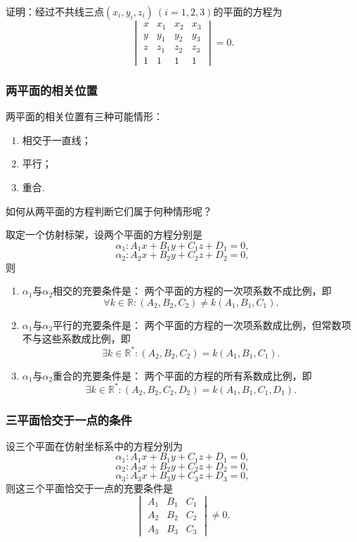 \begin{example}
证明：经过不共线三点\((x_i,y_i,z_i)\ (i=1,2,3)\)的平面的方程为\[
	\begin{vmatrix}
		x & x_1 & x_2 & x_3 \\
		y & y_1 & y_2 & y_3 \\
		z & z_1 & z_2 & z_3 \\
		1 & 1 & 1 & 1
	\end{vmatrix} = 0.
\]
\end{example}

\subsubsection{两平面的相关位置}
两平面的相关位置有三种可能情形：
\begin{enumerate}
	\item 相交于一直线；
	\item 平行；
	\item 重合.
\end{enumerate}
如何从两平面的方程判断它们属于何种情形呢？

\begin{theorem}
取定一个仿射标架，设两个平面的方程分别是\[
	\alpha_1: A_1 x + B_1 y + C_1 z + D_1 = 0,
\]\[
	\alpha_2: A_2 x + B_2 y + C_2 z + D_2 = 0,
\]
则\begin{enumerate}
	\item \(\alpha_1\)与\(\alpha_2\)相交的充要条件是：
	两个平面的方程的一次项系数不成比例，即\[
		\forall k \in \mathbb{R}:
		(A_2,B_2,C_2) \neq k (A_1,B_1,C_1).
	\]
	\item \(\alpha_1\)与\(\alpha_2\)平行的充要条件是：
	两个平面的方程的一次项系数成比例，但常数项不与这些系数成比例，即\[
		\exists k \in \mathbb{R}^*:
		(A_2,B_2,C_2) = k (A_1,B_1,C_1).
	\]
	\item \(\alpha_1\)与\(\alpha_2\)重合的充要条件是：
	两个平面的方程的所有系数成比例，即\[
		\exists k \in \mathbb{R}^*:
		(A_2,B_2,C_2,D_2) = k (A_1,B_1,C_1,D_1).
	\]
\end{enumerate}
\end{theorem}

\subsubsection{三平面恰交于一点的条件}
\begin{theorem}
设三个平面在仿射坐标系中的方程分别为\[
	\alpha_1: A_1 x + B_1 y + C_1 z + D_1 = 0,
\]\[
	\alpha_2: A_2 x + B_2 y + C_2 z + D_2 = 0,
\]\[
	\alpha_3: A_3 x + B_3 y + C_3 z + D_3 = 0,
\]
则这三个平面恰交于一点的充要条件是\[
	\begin{vmatrix}
		A_1 & B_1 & C_1 \\
		A_2 & B_2 & C_2 \\
		A_3 & B_3 & C_3
	\end{vmatrix}
	\neq 0.
\]
\end{theorem}

